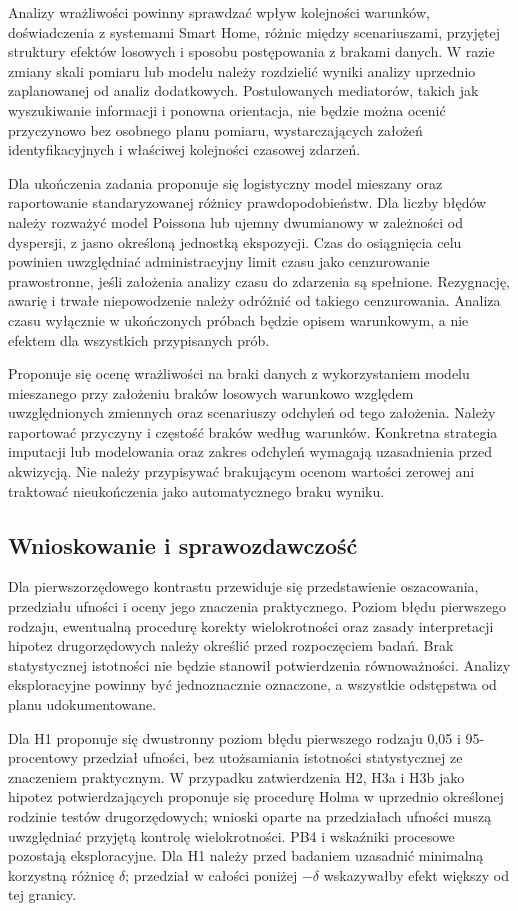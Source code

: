 \documentclass[11pt,a4paper]{article}
\begin{document}
Analizy wrażliwości powinny sprawdzać wpływ kolejności warunków, doświadczenia z systemami Smart Home, różnic między scenariuszami, przyjętej struktury efektów losowych i sposobu postępowania z brakami danych. W razie zmiany skali pomiaru lub modelu należy rozdzielić wyniki analizy uprzednio zaplanowanej od analiz dodatkowych. Postulowanych mediatorów, takich jak wyszukiwanie informacji i ponowna orientacja, nie będzie można ocenić przyczynowo bez osobnego planu pomiaru, wystarczających założeń identyfikacyjnych i właściwej kolejności czasowej zdarzeń.

Dla ukończenia zadania proponuje się logistyczny model mieszany oraz raportowanie standaryzowanej różnicy prawdopodobieństw. Dla liczby błędów należy rozważyć model Poissona lub ujemny dwumianowy w zależności od dyspersji, z jasno określoną jednostką ekspozycji. Czas do osiągnięcia celu powinien uwzględniać administracyjny limit czasu jako cenzurowanie prawostronne, jeśli założenia analizy czasu do zdarzenia są spełnione. Rezygnację, awarię i trwałe niepowodzenie należy odróżnić od takiego cenzurowania. Analiza czasu wyłącznie w ukończonych próbach będzie opisem warunkowym, a nie efektem dla wszystkich przypisanych prób.

Proponuje się ocenę wrażliwości na braki danych z wykorzystaniem modelu mieszanego przy założeniu braków losowych warunkowo względem uwzględnionych zmiennych oraz scenariuszy odchyleń od tego założenia. Należy raportować przyczyny i częstość braków według warunków. Konkretna strategia imputacji lub modelowania oraz zakres odchyleń wymagają uzasadnienia przed akwizycją. Nie należy przypisywać brakującym ocenom wartości zerowej ani traktować nieukończenia jako automatycznego braku wyniku.

\subsection{Wnioskowanie i sprawozdawczość}

Dla pierwszorzędowego kontrastu przewiduje się przedstawienie oszacowania, przedziału ufności i oceny jego znaczenia praktycznego. Poziom błędu pierwszego rodzaju, ewentualną procedurę korekty wielokrotności oraz zasady interpretacji hipotez drugorzędowych należy określić przed rozpoczęciem badań. Brak statystycznej istotności nie będzie stanowił potwierdzenia równoważności. Analizy eksploracyjne powinny być jednoznacznie oznaczone, a wszystkie odstępstwa od planu udokumentowane.

Dla H1 proponuje się dwustronny poziom błędu pierwszego rodzaju 0,05 i 95-procentowy przedział ufności, bez utożsamiania istotności statystycznej ze znaczeniem praktycznym. W przypadku zatwierdzenia H2, H3a i H3b jako hipotez potwierdzających proponuje się procedurę Holma w uprzednio określonej rodzinie testów drugorzędowych; wnioski oparte na przedziałach ufności muszą uwzględniać przyjętą kontrolę wielokrotności. PB4 i wskaźniki procesowe pozostają eksploracyjne. Dla H1 należy przed badaniem uzasadnić minimalną korzystną różnicę $\delta$; przedział w całości poniżej $-\delta$ wskazywałby efekt większy od tej granicy.
\end{document}
